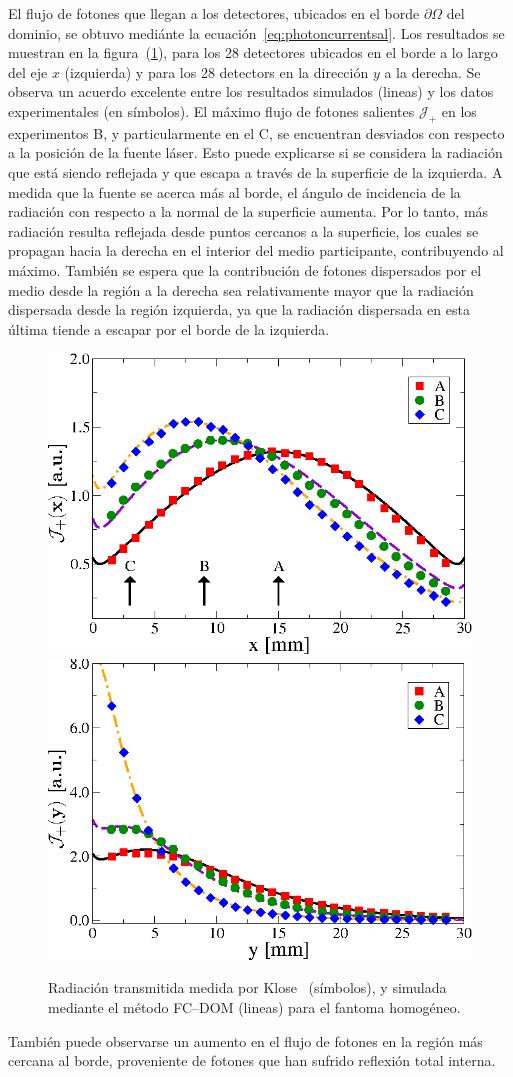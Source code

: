 El flujo de fotones que llegan a los detectores, ubicados en el borde $\partial \Omega$ 
del dominio, se obtuvo mediánte la ecuación~\eqref{eq:photoncurrentsal}. 
Los resultados se muestran en la figura~(\ref{fig:fluxph1}), 
para los 28 detectores ubicados en el borde a lo largo del eje $x$ (izquierda) 
y para los 28 detectors en la dirección $y$ a la derecha. 
Se observa un acuerdo excelente entre los resultados simulados (lineas) 
y los datos experimentales (en símbolos).  El máximo 
flujo de fotones salientes $\mathcal{J}_+$ en los experimentos B, 
y particularmente en el C, se encuentran desviados con respecto a la posición 
de la fuente láser. Esto puede explicarse si se considera la radiación 
que está siendo reflejada y que escapa a través de la superficie de la izquierda. 
A medida que la fuente se acerca más al borde, el ángulo de incidencia de la 
radiación con respecto a la normal de la superficie aumenta. Por lo tanto, 
más radiación resulta reflejada desde puntos cercanos a la superficie, 
los cuales se propagan hacia la derecha en el interior del medio participante, 
contribuyendo al máximo. También se espera que la contribución de fotones dispersados 
por el medio desde la región a la derecha sea relativamente mayor 
que la radiación dispersada desde la región izquierda, ya que la radiación 
dispersada en esta última tiende a escapar por el borde de la izquierda. 
\begin{figure}[h!]
\centering
  \includegraphics[width=0.48\linewidth]{figuras/kloseph1x.eps}
  \includegraphics[width=0.48\linewidth]{figuras/ph1y.eps}
  \caption{Radiación transmitida medida por Klose~\cite{Klose2002} (símbolos), 
  y simulada mediante el método FC--DOM (lineas) para el fantoma homogéneo. }
 \label{fig:fluxph1}
\end{figure}
También puede observarse un aumento en el flujo de fotones en la región más 
cercana al borde, proveniente de fotones que han sufrido reflexión total interna.

